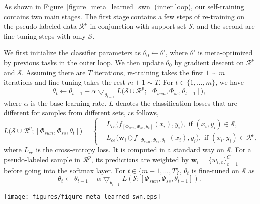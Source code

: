 \documentclass{article}
\begin{document}
As shown in Figure~\ref{figure_meta_learned_swn} (inner loop), our self-training contains two main stages. 
The first stage contains a few steps of re-training on the pseudo-labeled data $\mathcal{R}^p$ in conjunction with support set $\mathcal{S}$,
and the second are fine-tuning steps with only $\mathcal{S}$.

We first initialize the
classifier parameters as $\theta_{0} \leftarrow \theta'$, where $\theta'$ is meta-optimized by previous tasks in the outer loop.
We then update $\theta_{0}$ by gradient descent on $\mathcal{R}^p$ and $\mathcal{S}$.
Assuming there are $T$ iterations, re-training takes the first $1\sim m$ iterations and fine-tuning takes the rest $m+1 \sim T$. 
For $t \in \{1, ..., m\}$, we have
\begin{equation} 
\label{mixed_training_update}
\theta_{t} \leftarrow \theta_{t-1}-\alpha \bigtriangledown _{\theta_{t-1}}L\big( \mathcal{S}\cup\mathcal{R}^{p}; [\Phi_{swn}, \Phi_{ss}, \theta_{t-1}]\big),
\end{equation}
where $\alpha$ is the base learning rate. $L$ denotes the classification losses that are different for samples from different sets, as follows,
\begin{equation} 
\label{loss_penalty_inner_loop}
L\big(\mathcal{S}\cup\mathcal{R}^{p}; [\Phi_{swn}, \Phi_{ss}, \theta_{t}]\big)
=\begin{cases}
& L_{ce}\big(f_{[\Phi_{swn}, \Phi_{ss}, \theta_{t}]}(x_{i}), y_{i}),\text{ if }(x_{i},y_{i})\in  \mathcal{S},\\ 
& L_{ce}\big(\mathbf{w}_{i}\odot f_{[\Phi_{swn}, \Phi_{ss}, \theta_{t}]}(x_{i}), y_{i}), \text{ if }(x_{i}, y_{i})\in \mathcal{R}^{p},
\end{cases}
\end{equation}
where $L_{ce}$ is the cross-entropy loss.
It is computed in a standard way on $\mathcal{S}$. For a pseudo-labeled sample in $\mathcal{R}^p$, its predictions are weighted by $\mathbf{w}_{i} = \{w_{i,c}\}^C_{c=1}$ before going into the softmax layer.
For $t \in \{m+1, ..., T\}$, $\theta_t$ is fine-tuned on $\mathcal{S}$ as
\begin{equation} 
\label{finetune_update}
\theta_{t} \leftarrow \theta_{t-1}-\alpha \bigtriangledown _{\theta_{t-1}}L(\mathcal{S}; [\Phi_{swn}, \Phi_{ss}, \theta_{t-1}]).
\end{equation}



\begin{figure*}[t]
  \centering
  \texttt{[image: figures/figure\_meta\_learned\_swn.eps]}
     \caption{Outer-loop and inner-loop training procedures in our LST method.
The inner loop in the red box contains the $m$ steps of re-training (with $\mathcal{S}$ and $\mathcal{R}^p$) and $T-m$ steps of fine-tuning (with only $\mathcal{S}$).
     In recursive training, the fine-tuned $\theta_T$ replaces the initial MTL learned $\theta_T$ (see Section~\ref{sec_pseudolabeling}) for the pseudo-labeling at the next stage.}
  \label{figure_meta_learned_swn}
  \vspace{-4mm}
\end{figure*} 
\end{document}
